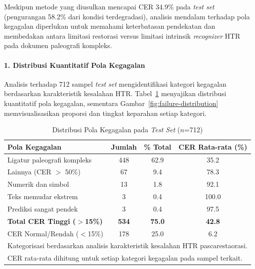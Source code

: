 \documentclass[12pt,a4paper]{article}
\begin{document}
Meskipun metode yang diusulkan mencapai CER 34.9\% pada \textit{test set} (pengurangan 58.2\% dari kondisi terdegradasi), analisis mendalam terhadap pola kegagalan diperlukan untuk memahami keterbatasan pendekatan dan membedakan antara limitasi restorasi versus limitasi intrinsik \textit{recognizer} HTR pada dokumen paleografi kompleks.

\paragraph{1. Distribusi Kuantitatif Pola Kegagalan}

Analisis terhadap 712 sampel \textit{test set} mengidentifikasi kategori kegagalan berdasarkan karakteristik kesalahan HTR. Tabel~\ref{table:failure-distribution} menyajikan distribusi kuantitatif pola kegagalan, sementara Gambar~\ref{fig:failure-distribution} memvisualisasikan proporsi dan tingkat keparahan setiap kategori.

\begin{table}[H]
\renewcommand{\arraystretch}{1.15}
\caption{Distribusi Pola Kegagalan pada \textit{Test Set} ($n$=712)}
\label{table:failure-distribution}
\centering
\small
\begin{tabular}{|l|c|c|c|}
\hline
\textbf{Pola Kegagalan} & \textbf{Jumlah} & \textbf{\% Total} & \textbf{CER Rata-rata (\%)} \\
\hline
Ligatur paleografi kompleks & 448 & 62.9 & 35.2 \\
Lainnya (CER $>$ 50\%) & 67 & 9.4 & 78.3 \\
Numerik dan simbol & 13 & 1.8 & 92.1 \\
Teks memudar ekstrem & 3 & 0.4 & 100.0 \\
Prediksi sangat pendek & 3 & 0.4 & 97.5 \\
\hline
\textbf{Total CER Tinggi ($>$15\%)} & \textbf{534} & \textbf{75.0} & \textbf{42.8} \\
CER Normal/Rendah ($<$15\%) & 178 & 25.0 & 6.2 \\
\hline
\multicolumn{4}{l}{\footnotesize Kategorisasi berdasarkan analisis karakteristik kesalahan HTR pascarestaorasi.} \\
\multicolumn{4}{l}{\footnotesize CER rata-rata dihitung untuk setiap kategori kegagalan pada sampel terkait.} \\
\end{tabular}
\end{table}
\end{document}
